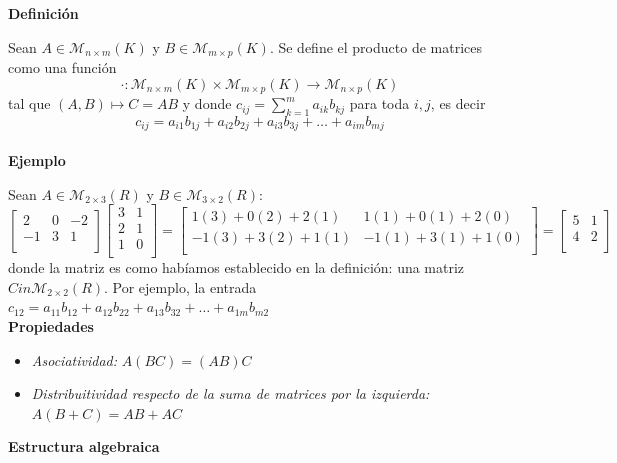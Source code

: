 \documentclass[10pt]{article}
\begin{document}
\noindent\textbf{Definición}

Sean $A \in \mathcal{M}_{n\times {m}}(K)$ y  $B \in \mathcal{M}_{m\times {p}}(K)$. Se define el producto de matrices como una función
$$
\cdot : \mathcal{M}_{n\times {m}}(K) \times \mathcal{M}_{m\times {p}}(K) \longrightarrow \mathcal{M}_{n\times {p}}(K)
$$ 
tal que $(A,B) \mapsto C = AB$ y donde $c_{ij}= \sum\limits_{k=1}^m a_{ik}b_{kj}$ para toda $i, j$, es decir
$$
c_{ij} = a_{i1}b_{1j} + a_{i2}b_{2j} + a_{i3}b_{3j} + \ldots + a_{im}b_{mj}
$$ \\

\noindent\textbf{Ejemplo}

Sean $A \in \mathcal{M}_{2\times {3}}(R)$ y $B \in \mathcal{M}_{3\times {2}}(R)$:
$$
\begin{bmatrix}
2 & 0 & -2 \\
-1 & 3 & 1 \\
\end{bmatrix}
\begin{bmatrix}
3 & 1 \\
2 & 1 \\
1 & 0 \\
\end{bmatrix}
=
\begin{bmatrix}
1(3) + 0(2) + 2(1) & 1(1) + 0(1) + 2(0) \\
-1(3) + 3(2) + 1(1) & -1(1) + 3(1) + 1(0) \\
\end{bmatrix}
=
\begin{bmatrix}
5 & 1 \\
4 & 2 \\
\end{bmatrix}
$$
donde la matriz es como habíamos establecido en la definición: una matriz $C in \mathcal{M}_{2\times {2}}(R)$. Por ejemplo, la entrada $c_{12} = a_{11}b_{12} + a_{12}b_{22} + a_{13}b_{32} + \ldots + a_{1m}b_{m2}$ \\

\noindent\textbf{Propiedades}

\begin{itemize}
\item \textit{Asociatividad:} $A(BC) = (AB)C$
\item \textit{Distribuitividad respecto de la suma de matrices por la izquierda:} $A(B+C) = AB + AC$
\end{itemize}


\noindent\textbf{Estructura algebraica}
\end{document}
